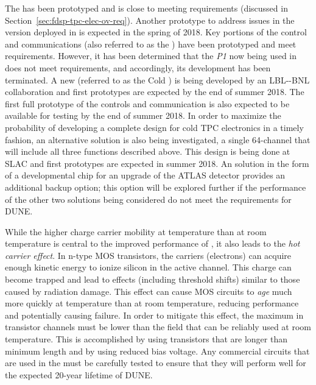 The   has been prototyped and is close to meeting requirements (discussed in Section~\ref{sec:fdsp-tpc-elec-ov-req}). Another prototype to address issues in the version deployed in  is expected in the spring of 2018. Key portions of the control and communications  (also referred to as the  ) have been prototyped and meet requirements.  However, it has been determined that the \textit{P1}   now being used in  does not meet requirements, and accordingly, its development has been terminated.  A new   (referred to as the Cold  ) is being developed by an LBL-\fnal-BNL collaboration and first prototypes are expected by the end of summer 2018.  The first full prototype of the controls and communication  is also expected to be available for testing by the end of summer 2018.  In order to maximize the probability of developing a complete design for cold TPC  electronics in a timely fashion, an alternative solution is also being investigated, a single \num{64}-channel  that will include all three functions described above.  This design is being done at SLAC and first prototypes are expected in summer 2018.  An  solution in the form of a developmental  chip for an upgrade of the ATLAS detector provides an additional backup option; this option will be explored further if the performance of the other two  solutions being considered do not meet the requirements for DUNE.

While the higher charge carrier mobility at \lar temperature than at room temperature is central to the improved performance of , it also leads to the \textit{hot carrier effect}.  In n-type MOS transistors, the carriers (electrons) can acquire enough kinetic energy to ionize silicon in the active channel.  This charge can become trapped and lead to effects (including threshold shifts) similar to those caused by radiation damage.  This effect can cause MOS circuits to \textit{age} much more quickly at \lar temperature than at room temperature, reducing performance and potentially causing failure.  In order to mitigate this effect, the maximum \efield in transistor channels must be lower than the field that can be reliably used at room temperature.  This is accomplished by using transistors that are longer than minimum length and by using reduced bias voltage.  Any commercial circuits that are used in the \lar must be carefully tested to ensure that they will perform well for the expected \num{20}-year lifetime of DUNE.

